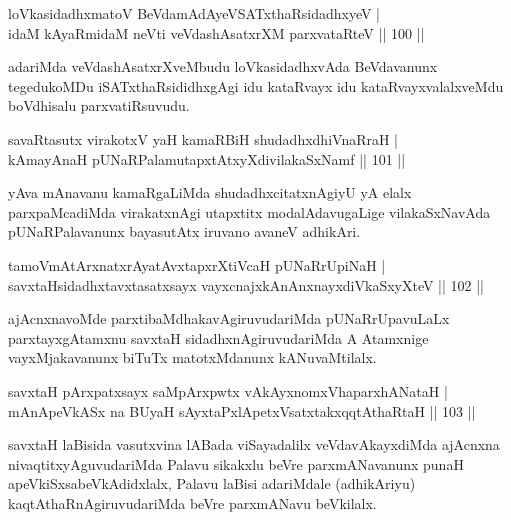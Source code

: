 \begin{shl}
loVkasidadhxmatoV BeVdamAdAyeVSATxthaRsidadhxyeV  | \\
idaM kAyaRmidaM neVti veVdashAsatxrXM parxvataRteV \hfill||  100 ||  
\end{shl}

\begin{artha}
adariMda veVdashAsatxrXveMbudu loVkasidadhxvAda BeVdavanunx tegedukoMDu iSATxthaRsididhxgAgi idu kataRvayx idu kataRvayxvalalxveMdu boVdhisalu parxvatiRsuvudu.
\end{artha}

\begin{shl}
savaRtasutx virakotxV yaH kamaRBiH shudadhxdhiVnaRraH  | \\
kAmayAnaH pUNaRPalamutapxtAtxyXdivilakaSxNamf \hfill||  101 ||  
\end{shl}

\begin{artha}
yAva mAnavanu kamaRgaLiMda shudadhxcitatxnAgiyU yA elalx parxpaMcadiMda virakatxnAgi utapxtitx modalAdavugaLige vilakaSxNavAda pUNaRPalavanunx bayasutAtx iruvano avaneV adhikAri.
\end{artha}

\begin{shl}
tamoVmAtArxnatxrAyatAvxtapxrXtiVcaH pUNaRrUpiNaH  | \\
savxtaHsidadhxtavxtasatxsayx vayxcnajxkAnAnxnayxdiVkaSxyXteV \hfill||  102 ||  
\end{shl}

\begin{artha}
ajAcnxnavoMde parxtibaMdhakavAgiruvudariMda pUNaRrUpavuLaLx parxtayxgAtamxnu savxtaH sidadhxnAgiruvudariMda A Atamxnige vayxMjakavanunx biTuTx matotxMdanunx kANuvaMtilalx.
\end{artha}

\begin{shl}
savxtaH pArxpatxsayx saMpArxpwtx vAkAyxnomxVhaparxhANataH  | \\
mAnApeVkASx na BUyaH sAyxtaPxlApetxVsatxtakxqqtAthaRtaH \hfill||  103 ||  
\end{shl}

\begin{artha}
savxtaH laBisida vasutxvina lABada viSayadalilx veVdavAkayxdiMda ajAcnxna nivaqtitxyAguvudariMda Palavu sikakxlu beVre parxmANavanunx punaH apeVkiSxsabeVkAdidxlalx, Palavu laBisi adariMdale (adhikAriyu) kaqtAthaRnAgiruvudariMda beVre parxmANavu beVkilalx.
\end{artha}

